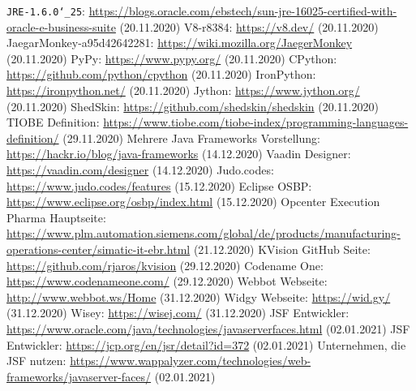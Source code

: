 \documentclass[ngerman]{article}
\begin{document}
\begin{thebibliography}{9}
        \texttt{JRE-1.6.0\char`_25}: \url{https://blogs.oracle.com/ebstech/sun-jre-16025-certified-with-oracle-e-business-suite} (20.11.2020)
        V8-r8384: \url{https://v8.dev/} (20.11.2020)
        JaegarMonkey-a95d42642281: \url{https://wiki.mozilla.org/JaegerMonkey} (20.11.2020)
        PyPy: \url{https://www.pypy.org/} (20.11.2020)
        CPython: \url{https://github.com/python/cpython} (20.11.2020)
        IronPython: \url{https://ironpython.net/} (20.11.2020)
        Jython: \url{https://www.jython.org/} (20.11.2020)
        ShedSkin: \url{https://github.com/shedskin/shedskin} (20.11.2020)
        TIOBE Definition: \url{https://www.tiobe.com/tiobe-index/programming-languages-definition/} (29.11.2020)
        Mehrere Java Frameworks Vorstellung: \url{https://hackr.io/blog/java-frameworks} (14.12.2020)
        Vaadin Designer: \url{https://vaadin.com/designer} (14.12.2020)
        Judo.codes: \url{https://www.judo.codes/features} (15.12.2020)
        Eclipse OSBP: \url{https://www.eclipse.org/osbp/index.html} (15.12.2020)
        Opcenter Execution Pharma Hauptseite: \url{https://www.plm.automation.siemens.com/global/de/products/manufacturing-operations-center/simatic-it-ebr.html} (21.12.2020)
        KVision GitHub Seite: \url{https://github.com/rjaros/kvision} (29.12.2020)
        Codename One: \url{https://www.codenameone.com/} (29.12.2020)
        Webbot Webseite: \url{http://www.webbot.ws/Home} (31.12.2020)
        Widgy Webseite: \url{https://wid.gy/} (31.12.2020)
        Wisey: \url{https://wisej.com/} (31.12.2020)
        JSF Entwickler: \url{https://www.oracle.com/java/technologies/javaserverfaces.html} (02.01.2021)
        JSF Entwickler: \url{https://jcp.org/en/jsr/detail?id=372} (02.01.2021)
        Unternehmen, die JSF nutzen: \url{https://www.wappalyzer.com/technologies/web-frameworks/javaserver-faces/} (02.01.2021)

\end{thebibliography}
\end{document}
